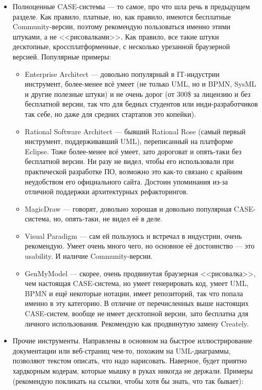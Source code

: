 \documentclass[a5paper]{article}
\begin{document}
\begin{itemize}
\begin{itemize}
    \end{itemize}
    \item Полноценные CASE-системы --- то самое, про что шла речь в предыдущем разделе. Как правило, платные, но, как правило, имеются бесплатные Community-версии, поэтому рекомендую пользоваться именно этими штуками, а не <<рисовалками>>. Как правило, все такие штуки десктопные, кроссплатформенные, с несколько урезанной браузерной версией. Популярные примеры:
    \begin{itemize}
        \item Enterprise Architect --- довольно популярный в IT-индустрии инструмент, более-менее всё умеет (не только UML, но и BPMN, SysML и другие полезные штуки) и не очень дорог (от 300\$ за лицензию и без бесплатной версии, так что для бедных студентов или инди-разработчиков так себе, но даже для средних стартапов это копейки).
        \item Rational Software Architect --- бывший Rational Rose (самый первый инструмент, поддерживавший UML), переписанный на платформе Eclipse. Тоже более-менее всё умеет, зато дороговат и опять-таки без бесплатной версии. Ни разу не видел, чтобы его использовали при практической разработке ПО, возможно это как-то связано с крайним неудобством его официального сайта. Достоин упоминания из-за отличной поддержки архитектурных рефакторингов.
        \item MagicDraw --- говорят, довольно хорошая и довольно популярная CASE-система, но, опять-таки, не видел её в деле.
        \item Visual Paradigm --- сам ей пользуюсь и встречал в индустрии, очень рекомендую. Умеет очень много чего, но основное её достоинство --- это usability. И наличие Community-версии.
        \item GenMyModel --- скорее, очень продвинутая браузерная <<рисовалка>>, чем настоящая CASE-система, но умеет генерировать код, умеет UML, BPMN и ещё некоторые нотации, имеет репозиторий, так что попала именно в эту категорию. В отличие от перечисленных выше настоящих CASE-систем, вообще не имеет десктопной версии, зато бесплатна для личного использования. Рекомендую как продвинутую замену Creately.
    \end{itemize}
    \item Прочие инструменты. Направлены в основном на быстрое иллюстрирование документации или веб-страниц чем-то, похожим на UML-диаграммы, позволяют текстом описать, что надо нарисовать. Наверное, будет приятно хардкорным кодерам, которые мышку в руках никогда не держали. Примеры (рекомендую покликать на ссылки, чтобы хотя бы знать, что так бывает):

\end{itemize}
\end{document}
